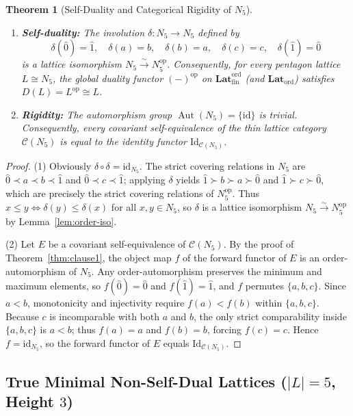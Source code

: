 \documentclass[11pt]{article}
\newtheorem{theorem}{Theorem}[section]
\theoremstyle{definition}
\newcommand{\CatC}{\mathcal{C}}
\newcommand{\LatOrd}{\mathbf{Lat}_{\mathrm{ord}}}
\newcommand{\FinLatOrd}{\mathbf{Lat}_{\mathrm{fin}}^{\mathrm{ord}}}
\newcommand{\Id}{\mathrm{Id}}
\newcommand{\op}{\mathrm{op}}
\newcommand{\Aut}{\operatorname{Aut}}
\begin{document}
\begin{theorem}[Self-Duality and Categorical Rigidity of $N_5$]
\label{thm:n5}
\leavevmode
\begin{enumerate}
  \item \textbf{Self-duality:} The involution $\delta : N_5 \to N_5$ defined by
  \[
    \delta(\hat{0}) = \hat{1}, \quad \delta(a) = b, \quad \delta(b) = a, \quad
    \delta(c) = c, \quad \delta(\hat{1}) = \hat{0}
  \]
  is a lattice isomorphism $N_5 \xrightarrow{\sim} N_5^{\op}$. Consequently, for
  every pentagon lattice $L \cong N_5$, the global duality functor $(-)^{\op}$ on
  $\FinLatOrd$ (and $\LatOrd$) satisfies $D(L) = L^{\op} \cong L$.
  \item \textbf{Rigidity:} The automorphism group $\Aut(N_5) = \{\mathrm{id}\}$
  is trivial. Consequently, every covariant self-equivalence of the thin lattice
  category $\CatC(N_5)$ is equal to the identity functor $\Id_{\CatC(N_5)}$.
\end{enumerate}
\end{theorem}

\begin{proof}
(1) Obviously $\delta \circ \delta = \mathrm{id}_{N_5}$. The strict covering
relations in $N_5$ are $\hat{0} \prec a \prec b \prec \hat{1}$ and
$\hat{0} \prec c \prec \hat{1}$; applying $\delta$ yields
$\hat{1} \succ b \succ a \succ \hat{0}$ and $\hat{1} \succ c \succ \hat{0}$,
which are precisely the strict covering relations of $N_5^{\op}$. Thus
$x \le y \iff \delta(y) \le \delta(x)$ for all $x, y \in N_5$, so $\delta$ is a
lattice isomorphism $N_5 \xrightarrow{\sim} N_5^{\op}$ by
Lemma~\ref{lem:order-iso}.

(2) Let $E$ be a covariant self-equivalence of $\CatC(N_5)$. By the proof of
Theorem~\ref{thm:clause1}, the object map $f$ of the forward functor of $E$ is an
order-automorphism of $N_5$. Any order-automorphism preserves the minimum and
maximum elements, so $f(\hat{0}) = \hat{0}$ and $f(\hat{1}) = \hat{1}$, and $f$
permutes $\{a, b, c\}$. Since $a < b$, monotonicity and injectivity require
$f(a) < f(b)$ within $\{a, b, c\}$. Because $c$ is incomparable with both $a$
and $b$, the only strict comparability inside $\{a, b, c\}$ is $a < b$; thus
$f(a) = a$ and $f(b) = b$, forcing $f(c) = c$. Hence $f = \mathrm{id}_{N_5}$, so
the forward functor of $E$ equals $\Id_{\CatC(N_5)}$.
\end{proof}

\subsection{True Minimal Non-Self-Dual Lattices (\texorpdfstring{$|L| = 5$}{|L| = 5}, Height \texorpdfstring{$3$}{3})}
\end{document}
